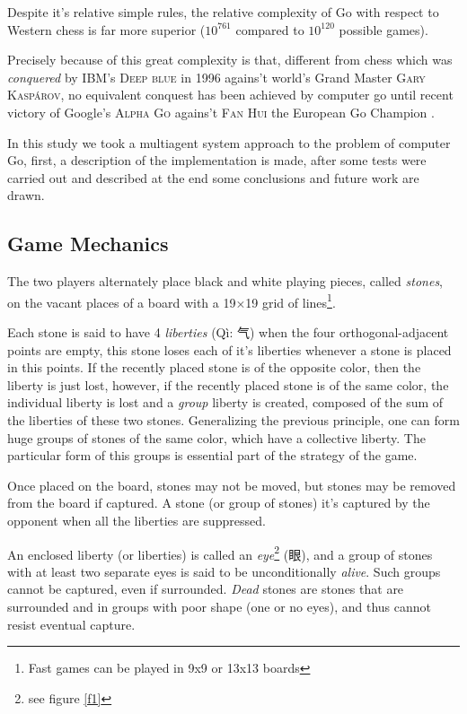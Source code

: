 \documentclass[a4paper,10pt,twocolumn]{article}
\begin{document}
\begin{CJK*}{UTF8}{gbsn}
Despite it's relative simple rules, the relative complexity of Go with respect to Western chess is far more superior ($10^{761}$ compared to $10^{120}$ possible games).

Precisely because of this great complexity is that, different from chess which was \emph{conquered} by IBM's \textsc{Deep blue} in 1996 agains't world's Grand Master \textsc{Gary Kaspárov}, no equivalent conquest has been achieved by computer go until recent victory of Google's \textsc{Alpha Go} agains't \textsc{Fan Hui} the European Go Champion \cite{Silver2016a}. 

In this study we took a multiagent system approach to the problem of computer Go, first, a description of the implementation is made, after some tests were carried out and described at the end some conclusions and future work are drawn.


\subsection{Game Mechanics}
The two players alternately place black and white playing pieces, called \emph{stones}, on the vacant places of a board with a 19×19 grid of lines\footnote{Fast games can be played in 9x9 or 13x13 boards}. 

Each stone is said to have 4 \emph{liberties} ({Qì:  气})  when the four orthogonal-adjacent points are empty, this stone loses each of it's liberties whenever a stone is placed in this points. If the recently placed stone is of the opposite color, then the liberty is just lost, however, if the recently placed stone is of the same color, the individual liberty is lost and a \emph{group} liberty is created, composed of the sum of the liberties of these two stones. Generalizing the previous principle, one can form huge groups of stones of the same color, which have a collective liberty. The particular form of this groups is essential part of the strategy of the game. 

Once placed on the board, stones may not be moved, but stones may be removed from the board if captured. A stone (or group of stones) it's captured by the opponent when all the liberties are suppressed.

 An enclosed liberty (or liberties) is called an \emph{eye}\footnote{see figure \ref{f1}} (眼), and a group of stones with at least two separate eyes is said to be unconditionally \emph{alive}. Such groups cannot be captured, even if surrounded. \emph{Dead} stones are stones that are surrounded and in groups with poor shape (one or no eyes), and thus cannot resist eventual capture.


\end{CJK*}
\end{document}
